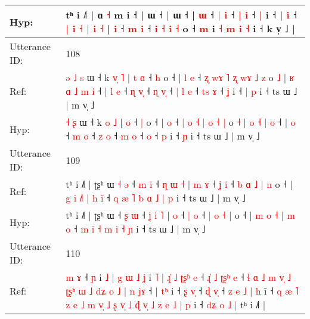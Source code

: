 \documentclass[10pt]{article}
\DeclareRobustCommand{\hl}[1]{{\textcolor{red}{#1}}}
\begin{document}
\begin{longtable}{ll}
 \\
Hyp: & tʰ i ˩˥ |\hl{}\hl{} ɑ \hl{˧} m i ˧ |\hl{}\hl{} ɯ ˧ \hl{|} ɯ ˧ |\hl{}\hl{}\hl{} \hl{}\hl{ɯ} ˧ \hl{}\hl{|} \hl{}\hl{i} ˧ \hl{}\hl{|} \hl{i} ˧ \hl{|} i ˧ |\hl{}\hl{}\hl{}\hl{}\hl{}\hl{}\hl{}\hl{}\hl{} \hl{i} ˧\hl{}\hl{}\hl{}\hl{}\hl{}\hl{}\hl{}\hl{}\hl{}\hl{}\hl{}\hl{}\hl{}\hl{} \hl{}\hl{}\hl{|} \hl{i} \hl{˧} \hl{}\hl{|} \hl{i} \hl{˧} |\hl{}\hl{} \hl{i} ˧ \hl{m} \hl{i} ˧ \hl{i} \hl{}\hl{˧} \hl{i} \hl{˧} o ˧ \hl{m} i\hl{}\hl{}\hl{}\hl{} \hl{˧} \hl{m} \hl{i} \hl{˧} i ˧ k v̩ ˩ |
 \\
\midrule
Utterance ID: & 108 \\
Ref: & \hl{ə}\hl{ }\hl{˩} \hl{s} ɯ ˧ k \hl{v}\hl{̩} \hl{˥} |\hl{ }\hl{t} \hl{ɑ} ˧ \hl{h} o ˧ |\hl{ }\hl{l} \hl{e} ˧ \hl{ʐ} \hl{w}\hl{ɤ} \hl{˥} \hl{ʐ} \hl{w}\hl{ɤ} \hl{˩} \hl{z} o \hl{˩} |\hl{ }\hl{ʁ} \hl{ɑ} \hl{˩} \hl{m} \hl{i} ˧ |\hl{ }\hl{l} \hl{e} ˧ \hl{ɳ} \hl{v}\hl{̩} ˧ \hl{ɳ} \hl{v}\hl{̩} ˧\hl{ }\hl{|} \hl{l} \hl{e} ˧\hl{ }\hl{t}\hl{s} \hl{ɤ} ˧ \hl{ʝ} i ˧\hl{ }\hl{|} \hl{p} i ˧ ts ɯ ˩ | m v̩ ˩
 \\
Hyp: & \hl{}\hl{}\hl{˧} \hl{ʂ} ɯ ˧ k \hl{}\hl{o} \hl{˩} |\hl{}\hl{} \hl{o} ˧ \hl{|} o ˧ |\hl{}\hl{} \hl{o} ˧ \hl{|} \hl{}\hl{o} \hl{˧} \hl{|} \hl{}\hl{o} \hl{˧} \hl{|} o \hl{˧} |\hl{}\hl{} \hl{o} \hl{˧} \hl{|} \hl{o} ˧ |\hl{}\hl{} \hl{o} ˧ \hl{m} \hl{}\hl{o} ˧ \hl{z} \hl{}\hl{o} ˧\hl{}\hl{} \hl{m} \hl{o} ˧\hl{}\hl{}\hl{} \hl{o} ˧ \hl{p} i ˧\hl{}\hl{} \hl{ɲ} i ˧ ts ɯ ˩ | m v̩ ˩
 \\
\midrule
Utterance ID: & 109 \\
Ref: & tʰ i ˩˥ | ʈʂʰ ɯ\hl{ }\hl{˧}\hl{ }\hl{ə} ˧ \hl{m} \hl{i} ˧ \hl{ɳ} \hl{ɯ} \hl{˧} |\hl{ }\hl{m} \hl{ɤ} ˧ \hl{ʝ} \hl{i} ˧ \hl{b} \hl{ɑ} \hl{˩} |\hl{ }\hl{n} o ˧ | \hl{g} \hl{i} \hl{˩}\hl{˥} | \hl{h} \hl{i}\hl{̃} ˧\hl{ }\hl{q} \hl{æ} \hl{˥} \hl{b} \hl{ɑ} \hl{˩} \hl{|} \hl{p} i ˧ ts ɯ ˩ | m v̩ ˩
 \\
Hyp: & tʰ i ˩˥ | ʈʂʰ ɯ\hl{}\hl{}\hl{}\hl{} ˧ \hl{ʂ} \hl{ɯ} ˧ \hl{ʝ} \hl{i} \hl{˥} |\hl{}\hl{} \hl{o} ˧ \hl{|} \hl{o} ˧ \hl{|} \hl{o} \hl{˧} |\hl{}\hl{} o ˧ | \hl{m} \hl{o} \hl{}\hl{˧} | \hl{m} \hl{}\hl{o} ˧\hl{}\hl{} \hl{m} \hl{i} \hl{˧} \hl{m} \hl{i} \hl{˧} \hl{ɲ} i ˧ ts ɯ ˩ | m v̩ ˩
 \\
\midrule
Utterance ID: & 110 \\
Ref: & \hl{m} \hl{ɤ} ˧ \hl{ɲ} i \hl{˩} |\hl{ }\hl{g}\hl{ }\hl{ɯ}\hl{ }\hl{˩}\hl{ }\hl{ʝ} i \hl{˥} |\hl{ }\hl{ɻ}\hl{̍}\hl{ }\hl{˩}\hl{ }\hl{ʈ}\hl{ʂ}\hl{ʰ} \hl{e} ˧\hl{ }\hl{ɻ}\hl{̍}\hl{ }\hl{˩} \hl{ʈ}\hl{ʂ}\hl{ʰ} \hl{e} ˧ \hl{ɬ} \hl{ɑ} \hl{˩} \hl{m} \hl{v}\hl{̩} \hl{˩} \hl{ʈ}\hl{ʂ}\hl{ʰ} \hl{ɯ} \hl{˩} \hl{d}\hl{ʑ} \hl{o} \hl{˩} |\hl{ }\hl{n} \hl{j}\hl{ɤ} ˧ |\hl{ }\hl{t}\hl{ʰ} i ˧ \hl{ʂ} \hl{v}\hl{̩} ˧ \hl{ɖ} \hl{v}\hl{̩} ˧ \hl{z} \hl{e} \hl{˩} |\hl{ }\hl{h} i\hl{̃} ˧\hl{ }\hl{q}\hl{ }\hl{æ} \hl{˥} \hl{z} \hl{e} \hl{˩} \hl{m} \hl{v}\hl{̩} \hl{˩} \hl{ʂ} \hl{v}\hl{̩} \hl{˩} \hl{ɖ} \hl{v}\hl{̩} \hl{˩} \hl{z} \hl{e} \hl{˩} \hl{|} \hl{p} i ˧ \hl{d}\hl{ʑ} \hl{o} \hl{˩} \hl{|} tʰ i ˩˥ |

\end{longtable}
\end{document}
